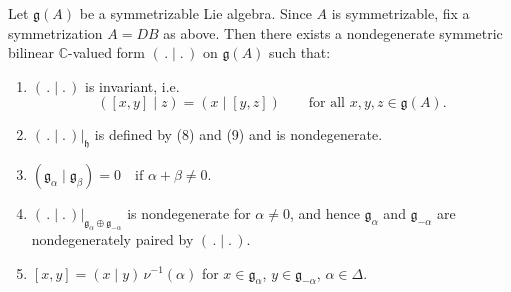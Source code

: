 \documentclass[12pt]{article}
\begin{document}
\begin{theorem}
    Let $\mathfrak{g}(A)$ be a symmetrizable Lie algebra. Since $A$ is symmetrizable, fix a symmetrization $A = DB$ as above. Then there exists a nondegenerate symmetric bilinear $\mathbb{C}$-valued form
    $(\,.\mid.\,)$ on $\mathfrak{g}(A)$ such that:
    \begin{enumerate}[label=\alph*)]
        \item $(\,.\mid.\,)$ is invariant, i.e.
              \[
                  ([x,y]\mid z) = (x \mid [y,z])
                  \qquad \text{for all } x,y,z \in \mathfrak{g}(A).
              \]
        \item $(\,.\mid.\,)|_{\mathfrak{h}}$ is defined by (8) and (9) and is nondegenerate.
        \item $(\mathfrak{g}_\alpha \mid \mathfrak{g}_\beta) = 0
                  \quad \text{if } \alpha+\beta \neq 0$.
        \item $(\,.\mid.\,)|_{\mathfrak{g}_\alpha \oplus \mathfrak{g}_{-\alpha}}$
              is nondegenerate for $\alpha \neq 0$, and hence
              $\mathfrak{g}_\alpha$ and $\mathfrak{g}_{-\alpha}$ are
              nondegenerately paired by $(\,.\mid.\,)$.
        \item $[x,y] = (x \mid y)\,\nu^{-1}(\alpha)$
              for $x \in \mathfrak{g}_\alpha$, $y \in \mathfrak{g}_{-\alpha}$,
              $\alpha \in \Delta$.
    \end{enumerate}
\end{theorem}
\end{document}
